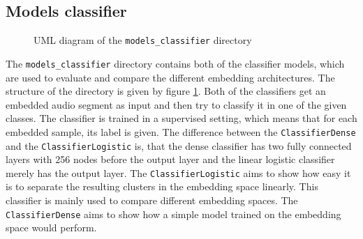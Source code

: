 \subsection{Models classifier}
\label{sub:Component-Models-Classifier}
\begin{figure}[htbp]
	\centering
	\caption{UML diagram of the \texttt{models\_classifier} directory}
	\label{fig:UML-Models-Classifier}
\end{figure}
\noindent
The \texttt{models\_classifier} directory contains both of the classifier models, which are used to evaluate and compare the different embedding architectures. The structure of the directory is given by figure \ref{fig:UML-Models-Classifier}. Both of the classifiers get an embedded audio segment as input and then try to classify it in one of the given classes. The classifier is trained in a supervised setting, which means that for each embedded sample, its label is given.
\newline
\newline
The difference between the \texttt{ClassifierDense} and the \texttt{ClassifierLogistic} is, that the dense classifier has two fully connected layers with 256 nodes before the output layer and the linear logistic classifier merely has the output layer. The \texttt{ClassifierLogistic} aims to show how easy it is to separate the resulting clusters in the embedding space linearly. This classifier is mainly used to compare different embedding spaces. The \texttt{ClassifierDense} aims to show how a simple model trained on the embedding space would perform.

